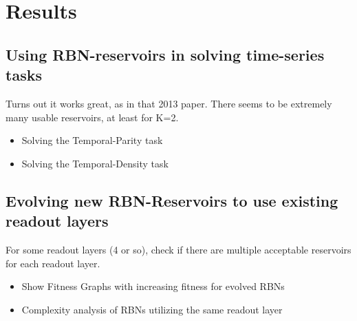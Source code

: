 \section{Results}

\begin{figure}
  \resizebox{\columnwidth}{!}{
    \subfloat[a]{
      
    }
    \subfloat[b]{
      
    }
  }

  \resizebox{\columnwidth}{!}{
    \subfloat[c]{
      
    }
    \subfloat[d]{
      
    }
  }
\end{figure}

\begin{figure}
  \resizebox{\columnwidth}{!}{
    \subfloat[a]{
      
    }
    \subfloat[b]{
      
    }
  }

  \resizebox{\columnwidth}{!}{
    \subfloat[c]{
      
    }
    \subfloat[d]{
      
    }
  }
\end{figure}

\subsection{Using RBN-reservoirs in solving time-series tasks}

Turns out it works great, as in that 2013 paper.
There seems to be extremely many usable reservoirs, at least for K=2.

\begin{itemize}
  \item Solving the Temporal-Parity task
  \item Solving the Temporal-Density task
\end{itemize}

\subsection{Evolving new RBN-Reservoirs to use existing readout layers}

For some readout layers (4 or so), check if there are multiple acceptable reservoirs for each readout layer.

\begin{itemize}
  \item Show Fitness Graphs with increasing fitness for evolved RBNs
  \item Complexity analysis of RBNs utilizing the same readout layer
\end{itemize}

